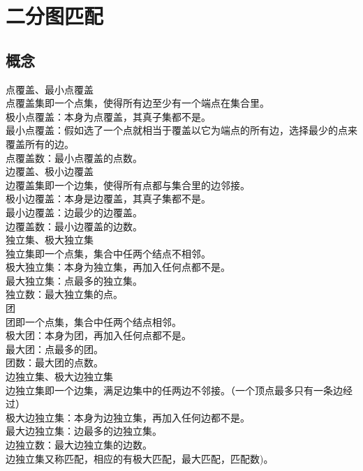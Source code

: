 \clearpage
\section{二分图匹配}

\subsection{概念}

点覆盖、最小点覆盖 \\
点覆盖集即一个点集，使得所有边至少有一个端点在集合里。 \\
极小点覆盖：本身为点覆盖，其真子集都不是。\\
最小点覆盖：假如选了一个点就相当于覆盖以它为端点的所有边，选择最少的点来覆盖所有的边。 \\
点覆盖数：最小点覆盖的点数。 \\

边覆盖、极小边覆盖 \\
边覆盖集即一个边集，使得所有点都与集合里的边邻接。 \\
极小边覆盖：本身是边覆盖，其真子集都不是。 \\
最小边覆盖：边最少的边覆盖。 \\
边覆盖数：最小边覆盖的边数。 \\

独立集、极大独立集 \\
独立集即一个点集，集合中任两个结点不相邻。 \\
极大独立集：本身为独立集，再加入任何点都不是。 \\
最大独立集：点最多的独立集。 \\
独立数：最大独立集的点。 \\

团 \\
团即一个点集，集合中任两个结点相邻。 \\
极大团：本身为团，再加入任何点都不是。 \\
最大团：点最多的团。 \\
团数：最大团的点数。 \\

边独立集、极大边独立集 \\
边独立集即一个边集，满足边集中的任两边不邻接。（一个顶点最多只有一条边经过） \\
极大边独立集：本身为边独立集，再加入任何边都不是。 \\
最大边独立集：边最多的边独立集。 \\
边独立数：最大边独立集的边数。 \\
边独立集又称匹配，相应的有极大匹配，最大匹配，匹配数)。 \\

